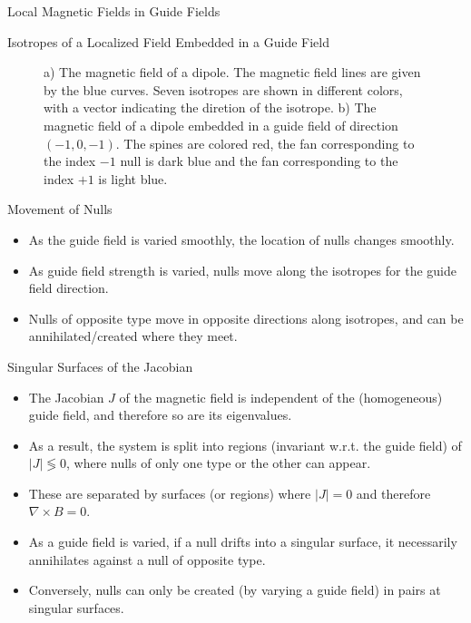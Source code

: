 \documentclass[final]{beamer}
\newlength{\onecolwid}
\begin{document}
\begin{frame}[t]
\begin{columns}[t]
\begin{column}{\onecolwid}
\begin{block}{\huge{Local Magnetic Fields in Guide Fields}}
\begin{block}{Isotropes of a Localized Field Embedded in a Guide Field}
\begin{figure}
\begin{subfigure}[b]{.3\textwidth}
      \caption{}
    \end{subfigure}
    \caption{
      a) The magnetic field of a dipole.
      The magnetic field lines are given by the blue curves.
      Seven isotropes are shown in different colors, with a vector indicating the diretion of the
      isotrope. b) The magnetic field of a dipole embedded in a guide field of direction $(-1,0,-1)$. 
      The spines are colored red, the fan corresponding to the
      index $-1$ null is dark blue and the fan corresponding to the
      index $+1$ is light blue.
    }
  \end{figure}
\end{block}

\begin{block}{Movement of Nulls}
  \begin{itemize}
    \item As the guide field is varied smoothly, the location of nulls changes smoothly.
    \item As guide field strength is varied, nulls move along the isotropes for the guide field direction.
    \item Nulls of opposite type move in opposite directions along isotropes,
      and can be annihilated/created where they meet.
  \end{itemize}
\end{block}

\begin{block}{Singular Surfaces of the Jacobian}
  \begin{itemize}
    \item The Jacobian $J$ of the magnetic field is independent of the (homogeneous) guide field,
      and therefore so are its eigenvalues.
    \item As a result, the system is split into regions (invariant w.r.t. the guide field) of $|J|\lessgtr 0$,
      where nulls of only one type or the other can appear.
    \item These are separated by surfaces (or regions) where $|J|=0$ and therefore $\nabla\times B=0$.
    \item As a guide field is varied, if a null drifts into a singular surface, it necessarily annihilates
      against a null of opposite type.
    \item Conversely, nulls can only be created (by varying a guide field) in pairs at singular surfaces.
    \end{itemize}
\end{block}


\end{block}
\end{column}
\end{columns}
\end{frame}
\end{document}
